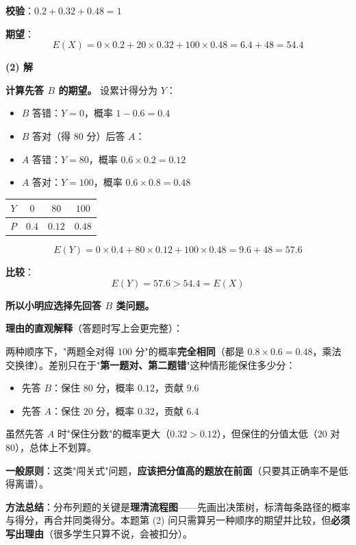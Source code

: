 \begin{answer}
\textbf{校验}：$0.2+0.32+0.48=1$ 

\textbf{期望}：
\nopagebreak[4]
\[E(X)=0\times0.2+20\times0.32+100\times0.48=6.4+48=54.4\]

\par\medskip

\textbf{(2) 解}

\textbf{计算先答 $B$ 的期望。} 设累计得分为 $Y$：

\begin{itemize}
\item $B$ 答错：$Y=0$，概率 $1-0.6=0.4$
\item $B$ 答对（得 $80$ 分）后答 $A$：
\item $A$ 答错：$Y=80$，概率 $0.6\times0.2=0.12$
\item $A$ 答对：$Y=100$，概率 $0.6\times0.8=0.48$
\end{itemize}

\begin{center}
\begin{tabular}{cccc}
\toprule
$Y$ & $0$ & $80$ & $100$ \\
\midrule
$P$ & $0.4$ & $0.12$ & $0.48$ \\
\bottomrule
\end{tabular}
\end{center}

\nopagebreak[4]
\[E(Y)=0\times0.4+80\times0.12+100\times0.48=9.6+48=57.6\]

\textbf{比较}：
\nopagebreak[4]
\[E(Y)=57.6>54.4=E(X)\]

\textbf{所以小明应选择先回答 $B$ 类问题。}

\par\medskip

\textbf{理由的直观解释}（答题时写上会更完整）：

两种顺序下，"两题全对得 $100$ 分"的概率\textbf{完全相同}（都是 $0.8\times0.6=0.48$，乘法交换律）。差别只在于"\textbf{第一题对、第二题错}"这种情形能保住多少分：

\begin{itemize}
\item 先答 $B$：保住 $80$ 分，概率 $0.12$，贡献 $9.6$
\item 先答 $A$：保住 $20$ 分，概率 $0.32$，贡献 $6.4$
\end{itemize}

虽然先答 $A$ 时"保住分数"的概率更大（$0.32>0.12$），但保住的分值太低（$20$ 对 $80$），总体上不划算。

\textbf{一般原则}：这类"闯关式"问题，\textbf{应该把分值高的题放在前面}（只要其正确率不是低得离谱）。

\begin{gktip}
\textbf{方法总结}：分布列题的关键是\textbf{理清流程图}——先画出决策树，标清每条路径的概率与得分，再合并同类得分。本题第 (2) 问只需算另一种顺序的期望并比较，但\textbf{必须写出理由}（很多学生只算不说，会被扣分）。
\end{gktip}



\par\medskip

\end{answer}

